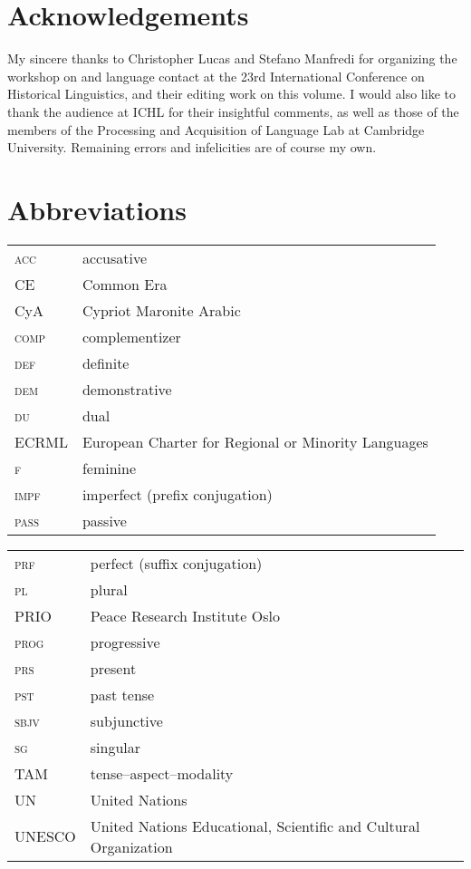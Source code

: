 \documentclass[output=paper]{langsci/langscibook}
\begin{document}
\section*{Acknowledgements}
My sincere thanks to Christopher Lucas and Stefano Manfredi for organizing the workshop on  and language contact at the 23rd International Conference on Historical Linguistics, and their editing work on this volume. I would also like to thank the audience at ICHL for their insightful comments, as well as those of the members of the Processing and Acquisition of Language Lab at Cambridge University. Remaining errors and infelicities are of course my own.



\section*{Abbreviations}
\begin{tabularx}{.5\textwidth}{@{}lQ@{}}
\textsc{acc} & accusative\\
CE & Common Era\\
CyA & Cypriot Maronite Arabic\\
\textsc{comp} & {complementizer}\\
\textsc{def} & {definite}\\
\textsc{dem} & demonstrative\\
\textsc{du} & dual\\
ECRML & European Charter for Regional or Minority Languages\\
\textsc{f} & feminine\\
\textsc{impf} & imperfect (prefix conjugation)\\
\textsc{pass} & {passive}\\
\end{tabularx}%
\begin{tabularx}{.5\textwidth}{@{}lQ@{}}
\textsc{prf} & perfect (suffix conjugation)\\
\textsc{pl} & plural\\
PRIO & Peace Research Institute Oslo\\
\textsc{prog} & progressive \\
\textsc{prs} & present\\
\textsc{pst} & past {tense}\\
\textsc{sbjv} & subjunctive\\
\textsc{sg} & singular\\
TAM & tense--aspect--{modality}\\
UN & United Nations\\
UNESCO & United Nations Educational, Scientific and Cultural Organization
\end{tabularx}%


{\sloppy\printbibliography[heading=subbibliography,notkeyword=this]}
\end{document}
